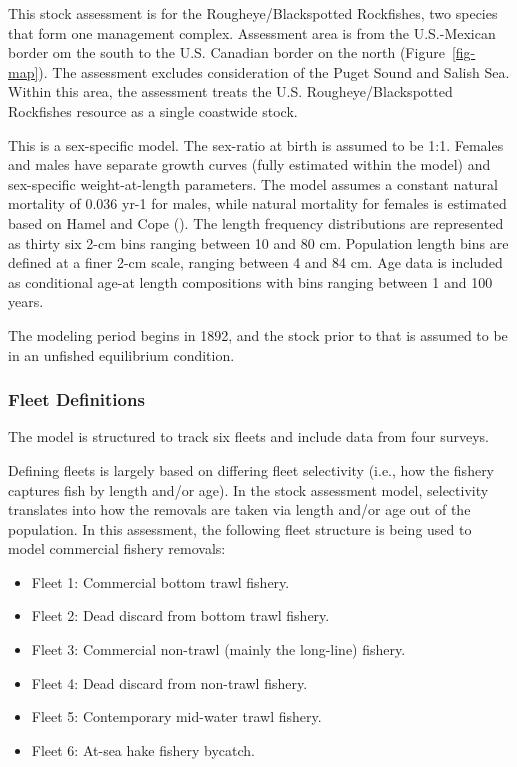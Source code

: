 \documentclass[
]{scrartcl}
\providecommand{\tightlist}{%
  \setlength{\itemsep}{0pt}\setlength{\parskip}{0pt}}\usepackage{longtable,booktabs,array}
\begin{document}
This stock assessment is for the Rougheye/Blackspotted Rockfishes, two
species that form one management complex. Assessment area is from the
U.S.-Mexican border om the south to the U.S. Canadian border on the
north (Figure~\ref{fig-map}). The assessment excludes consideration of
the Puget Sound and Salish Sea. Within this area, the assessment treats
the U.S. Rougheye/Blackspotted Rockfishes resource as a single coastwide
stock.

This is a sex-specific model. The sex-ratio at birth is assumed to be
1:1. Females and males have separate growth curves (fully estimated
within the model) and sex-specific weight-at-length parameters. The
model assumes a constant natural mortality of 0.036 yr-1 for males,
while natural mortality for females is estimated based on Hamel and Cope
(). The length frequency
distributions are represented as thirty six 2-cm bins ranging between 10
and 80 cm. Population length bins are defined at a finer 2-cm scale,
ranging between 4 and 84 cm. Age data is included as conditional age-at
length compositions with bins ranging between 1 and 100 years.

The modeling period begins in 1892, and the stock prior to that is
assumed to be in an unfished equilibrium condition.

\subsubsection{Fleet Definitions}\label{sec-fleet}

The model is structured to track six fleets and include data from four
surveys.

Defining fleets is largely based on differing fleet selectivity (i.e.,
how the fishery captures fish by length and/or age). In the stock
assessment model, selectivity translates into how the removals are taken
via length and/or age out of the population. In this assessment, the
following fleet structure is being used to model commercial fishery
removals:

\begin{itemize}
\tightlist
\item
  Fleet 1: Commercial bottom trawl fishery.
\item
  Fleet 2: Dead discard from bottom trawl fishery.
\item
  Fleet 3: Commercial non-trawl (mainly the long-line) fishery.
\item
  Fleet 4: Dead discard from non-trawl fishery.
\item
  Fleet 5: Contemporary mid-water trawl fishery.
\item
  Fleet 6: At-sea hake fishery bycatch.
\end{itemize}
\end{document}

